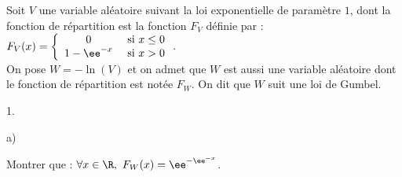 \noindent
Soit $V$ une variable aléatoire suivant la loi exponentielle de
paramètre $1$, dont la fonction de répartition est la fonction $F_{V}$
définie par : $F_{V}(x) = \left\{
  \begin{array}{cl}
    0 & \hbox{ si } x \leq 0\\
    1-\ee^{-x} & \hbox{ si } x>0 
  \end{array}
\right.$.\\
On pose $W = -\ln(V)$ et on admet que $W$ est aussi une variable
aléatoire dont le fonction de répartition est notée $F_{W}$. On dit
que $W$ suit une loi de Gumbel.
\begin{noliste}{1.}
  \setlength{\itemsep}{4mm}
\item
  \begin{noliste}{a)}
    \setlength{\itemsep}{2mm}
  \item Montrer que : $\forall x \in \R, \ F_{W}(x) =
    \ee^{-\ee^{-x}}$.
    

\end{noliste}
\end{noliste}
